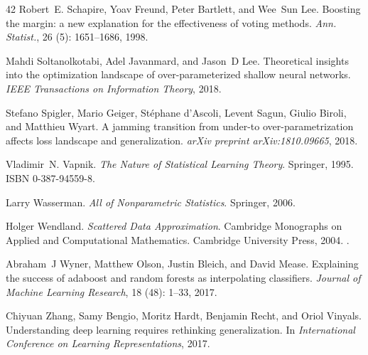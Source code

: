 \documentclass[11pt]{article}
\begin{document}
\begin{thebibliography}{42}
Robert~E. Schapire, Yoav Freund, Peter Bartlett, and Wee~Sun Lee.
\newblock Boosting the margin: a new explanation for the effectiveness of
  voting methods.
\newblock \emph{Ann. Statist.}, 26 (5): 1651--1686, 1998.

Mahdi Soltanolkotabi, Adel Javanmard, and Jason~D Lee.
\newblock Theoretical insights into the optimization landscape of
  over-parameterized shallow neural networks.
\newblock \emph{IEEE Transactions on Information Theory}, 2018.

Stefano Spigler, Mario Geiger, St{\'e}phane d'Ascoli, Levent Sagun, Giulio
  Biroli, and Matthieu Wyart.
\newblock A jamming transition from under-to over-parametrization affects loss
  landscape and generalization.
\newblock \emph{arXiv preprint arXiv:1810.09665}, 2018.

Vladimir~N. Vapnik.
\newblock \emph{The Nature of Statistical Learning Theory}.
\newblock Springer, 1995.
\newblock ISBN 0-387-94559-8.

Larry Wasserman.
\newblock \emph{All of Nonparametric Statistics}.
\newblock Springer, 2006.

Holger Wendland.
\newblock \emph{Scattered Data Approximation}.
\newblock Cambridge Monographs on Applied and Computational Mathematics.
  Cambridge University Press, 2004.
\newblock {}.

Abraham~J Wyner, Matthew Olson, Justin Bleich, and David Mease.
\newblock Explaining the success of adaboost and random forests as
  interpolating classifiers.
\newblock \emph{Journal of Machine Learning Research}, 18
  (48): 1--33, 2017.

Chiyuan Zhang, Samy Bengio, Moritz Hardt, Benjamin Recht, and Oriol Vinyals.
\newblock Understanding deep learning requires rethinking generalization.
\newblock In \emph{International Conference on Learning Representations}, 2017.

\end{thebibliography}
 
\end{document}
